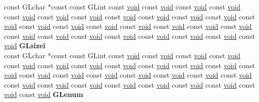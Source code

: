 \begin{DoxyCompactItemize}
\begin{tabbing}
\>const GLchar $\ast$const const GLint const \hyperlink{interfacevoid}{void} const \hyperlink{interfacevoid}{void} const \hyperlink{interfacevoid}{void} const \hyperlink{interfacevoid}{void} const \hyperlink{interfacevoid}{void} const \hyperlink{interfacevoid}{void} const \hyperlink{interfacevoid}{void} const \hyperlink{interfacevoid}{void} const \hyperlink{interfacevoid}{void} const \hyperlink{interfacevoid}{void} const \hyperlink{interfacevoid}{void} const \hyperlink{interfacevoid}{void} const \hyperlink{interfacevoid}{void} const \hyperlink{interfacevoid}{void} const \hyperlink{interfacevoid}{void} const \hyperlink{interfacevoid}{void} const \hyperlink{interfacevoid}{void} const \hyperlink{interfacevoid}{void} const \hyperlink{interfacevoid}{void} const \hyperlink{interfacevoid}{void} const \hyperlink{interfacevoid}{void} const \hyperlink{interfacevoid}{void} const \hyperlink{interfacevoid}{void} const \hyperlink{interfacevoid}{void} const \hyperlink{interfacevoid}{void} const \hyperlink{interfacevoid}{void} const \hyperlink{interfacevoid}{void} {\bfseries GLsizei}\\
\>const GLchar $\ast$const const GLint const \hyperlink{interfacevoid}{void} const \hyperlink{interfacevoid}{void} const \hyperlink{interfacevoid}{void} const \hyperlink{interfacevoid}{void} const \hyperlink{interfacevoid}{void} const \hyperlink{interfacevoid}{void} const \hyperlink{interfacevoid}{void} const \hyperlink{interfacevoid}{void} const \hyperlink{interfacevoid}{void} const \hyperlink{interfacevoid}{void} const \hyperlink{interfacevoid}{void} const \hyperlink{interfacevoid}{void} const \hyperlink{interfacevoid}{void} const \hyperlink{interfacevoid}{void} const \hyperlink{interfacevoid}{void} const \hyperlink{interfacevoid}{void} const \hyperlink{interfacevoid}{void} const \hyperlink{interfacevoid}{void} const \hyperlink{interfacevoid}{void} const \hyperlink{interfacevoid}{void} const \hyperlink{interfacevoid}{void} const \hyperlink{interfacevoid}{void} const \hyperlink{interfacevoid}{void} const \hyperlink{interfacevoid}{void} const \hyperlink{interfacevoid}{void} const \hyperlink{interfacevoid}{void} const \hyperlink{interfacevoid}{void} const \hyperlink{interfacevoid}{void} {\bfseries GLenum}\\

\end{tabbing}
\end{DoxyCompactItemize}
